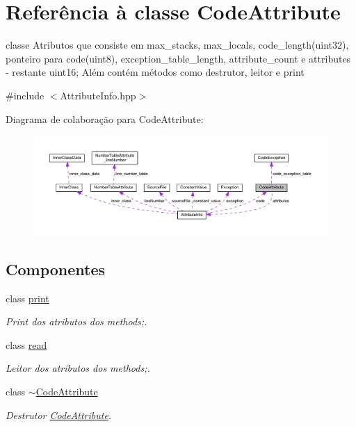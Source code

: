 \hypertarget{class_code_attribute}{}\section{Referência à classe Code\+Attribute}
\label{class_code_attribute}


classe Atributos que consiste em max\+\_\+stacks, max\+\_\+locals, code\+\_\+length(uint32), ponteiro para code(uint8), exception\+\_\+table\+\_\+length, attribute\+\_\+count e attributes -\/ restante uint16; Além contém métodos como destrutor, leitor e print  




{\ttfamily \#include $<$Attribute\+Info.\+hpp$>$}



Diagrama de colaboração para Code\+Attribute\+:
\nopagebreak
\begin{figure}[H]
\begin{center}
\leavevmode
\includegraphics[width=350pt]{class_code_attribute__coll__graph}
\end{center}
\end{figure}
\subsection*{Componentes}
\begin{DoxyCompactItemize}
\item 
class \hyperlink{class_code_attribute_1_1print}{print}
\begin{DoxyCompactList}\small\item\em Print dos atributos dos methods;. \end{DoxyCompactList}\item 
class \hyperlink{class_code_attribute_1_1read}{read}
\begin{DoxyCompactList}\small\item\em Leitor dos atributos dos methods;. \end{DoxyCompactList}\item 
class \hyperlink{class_code_attribute_1_1~_code_attribute}{$\sim$\+Code\+Attribute}
\begin{DoxyCompactList}\small\item\em Destrutor \hyperlink{class_code_attribute}{Code\+Attribute}. \end{DoxyCompactList}\end{DoxyCompactItemize}
